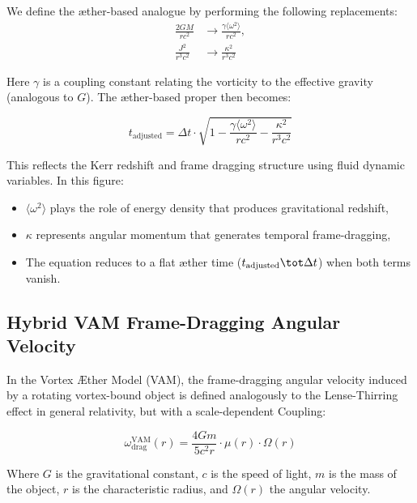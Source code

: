 We define the æther-based analogue by performing the following replacements:
\begin{equation}
    \begin{aligned}
        \frac{2GM}{rc^2} &\rightarrow \frac{\gamma \langle \omega^2 \rangle}{rc^2}, \\
        \frac{J^2}{r^3c^2} &\rightarrow \frac{\kappa^2}{r^3c^2}
    \end{aligned}
    \label{eq:Kerr_replacements}
\end{equation}

Here $\gamma$ is a coupling constant relating the vorticity to the effective gravity (analogous to $G$). The æther-based proper then becomes:

\begin{equation}
    \boxed{t_{\text{adjusted}} = \Delta t \cdot \sqrt{1 - \frac{\gamma \langle \omega^2 \rangle}{rc^2} - \frac{\kappa^2}{r^3c^2}}}
    \label{eq:Kerr_time_dilation_ae}
\end{equation}

This reflects the Kerr redshift and frame dragging structure using fluid dynamic variables. In this figure:
\begin{itemize}
    \item $\langle \omega^2 \rangle$ plays the role of energy density that produces gravitational redshift,
    \item $\kappa$ represents angular momentum that generates temporal frame-dragging,
    \item The equation reduces to a flat æther time ($t_{\text{adjusted}} \tot \Delta t$) when both terms vanish.

\end{itemize}

\subsection*{Hybrid VAM Frame-Dragging Angular Velocity}

In the Vortex Æther Model (VAM), the frame-dragging angular velocity induced by a rotating vortex-bound object is defined analogously to the Lense-Thirring effect in general relativity, but with a scale-dependent Coupling:

\begin{equation}
    \omega_{\text{drag}}^{\text{VAM}}(r) =
    \frac{4 G m}{5 c^2 r} \cdot \mu(r) \cdot \Omega(r)
\end{equation}

Where \( G \) is the gravitational constant, \( c \) is the speed of light, \( m \) is the mass of the object, \( r \) is the characteristic radius, and \( \Omega(r) \) the angular velocity.

